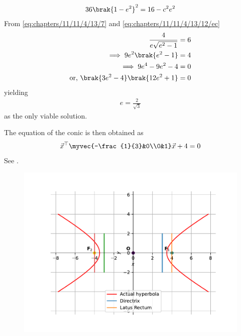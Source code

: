 \begin{enumerate}
		\begin{align}
	36\brak{1-e^2}^2 = 16-c^2e^2
\label{eq:chapters/11/11/4/13/12/ec}
\end{align}
From
	\eqref{eq:chapters/11/11/4/13/7}
	and
\eqref{eq:chapters/11/11/4/13/12/ec}
\begin{align}
\frac{4}{e\sqrt{e^2-1}} &= 6
\\
\implies 9e^2\brak{e^2-1} &= 4\\
\implies 9e^4-9e^2-4 &= 0
\\
	\text{or, }\brak{3e^2-4}
	\brak{12e^2+1} &=0
\label{eq:chapters/11/11/4/13/14}
\end{align}
yielding
\begin{align}
e = \frac{2}{\sqrt 3}
\end{align}
as the only viable solution.
\end{enumerate}
The equation of the conic is then obtained as
\begin{align}
\vec{x}^\top\myvec{-\frac{1}{3}&0\\0&1}\vec{x} +4 = 0
\end{align}
See .
\begin{figure}[H]
\centering
\includegraphics[width=0.75\columnwidth]{chapters/11/11/4/13/figs/fig.pdf}
\caption{}
\label{fig:chapters/11/11/4/13/1}
\end{figure}
\begin{table}[H]
\centering

\caption{}
\label{tab:chapters/11/11/4/13/1}
\end{table}
